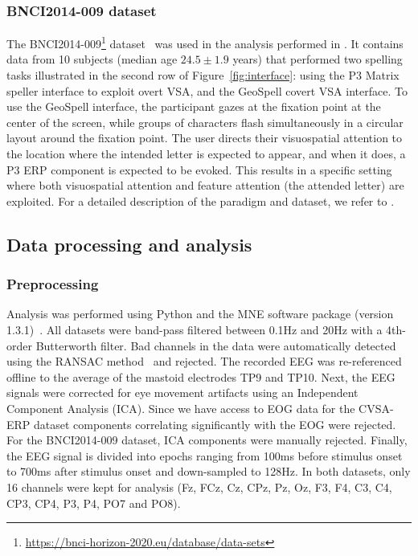 \subsubsection{BNCI2014-009 dataset}
The
BNCI2014-009\footnote{\url{https://bnci-horizon-2020.eu/database/data-sets}}
dataset~\cite{Aloise2012a} was used in the analysis performed
in \cite{Arico2014}.
It contains data from 10 subjects (median age $24.5\pm1.9$
years)  that performed two spelling tasks illustrated in the second row of
Figure~\ref{fig:interface}: using the P3 Matrix speller
interface to exploit overt VSA, and the GeoSpell covert VSA interface.
To use the GeoSpell interface, the participant gazes at the fixation point at the
center of the screen, while groups of characters flash simultaneously in a
circular layout around the fixation point.
The user directs their visuospatial attention to the location where the intended letter is expected
to appear, and when it does, a P3 ERP component is expected to be evoked.
This results in a specific setting where both visuospatial attention and
feature attention (the attended letter) are exploited.
For a detailed description of the paradigm and dataset, we refer
to \cite{Aloise2012a}.

\subsection{Data processing and analysis}
\subsubsection{Preprocessing}
Analysis was performed using Python and the MNE software package (version
1.3.1)~\cite{Gramfort2013}.
All datasets were band-pass filtered between 0.1Hz and 20Hz with a 4th-order Butterworth filter.
Bad channels in the data were automatically detected using the RANSAC
method~\cite{Fischler1981} and rejected.
The recorded EEG was re-referenced
offline to the average of the mastoid electrodes TP9 and TP10.
Next, the EEG signals were corrected for eye movement artifacts using an
Independent Component Analysis (ICA).
Since we have access to EOG data for the CVSA-ERP dataset components correlating
significantly with the EOG were rejected.
For the BNCI2014-009 dataset, ICA components were manually rejected.
Finally, the EEG signal is divided into epochs ranging from 100ms before stimulus onset to 700ms after stimulus onset and down-sampled to 128Hz.
In both datasets, only 16 channels were kept for
analysis (Fz, FCz, Cz, CPz, Pz, Oz, F3, F4, C3, C4, CP3, CP4, P3, P4, PO7 and
PO8).

